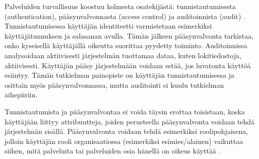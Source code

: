 Palveluiden turvallisuus koostuu kolmesta osatekijästä: tunnistautumisesta (authentication), pääsynvalvonnasta (access control) ja auditoinnista (audit) \cite{sandhu}. Tunnistautumisessa käyttäjän identiteetti varmistetaan esimerkiksi käyttäjätunnuksen ja salasanan avulla. Tämän jälkeen pääsynvalvonta tarkistaa, onko kyseisellä käyttäjällä oikeutta suorittaa pyydetty toiminto. Auditoinnissa analysoidaan aktiivisesti järjestelmän tuottamaa dataa, kuten lokitiedostoja, aktiivisesti. Käyttäjän pääsy järjestelmään voidaan estää, jos luvatonta käyttöä esiintyy. Tämän tutkielman pai\-no\-pis\-te on käyttäjän tunnistautumisessa ja osittain myös pääsynvalvonnassa, mutta auditointi ei kuulu tutkielman aihepiiriin.

Tunnistautumista ja pääsynvalvontaa ei voida täysin erottaa toisistaan, koska käyttäjään liittyy attribuutteja, joiden perusteella pääsynvalvonta voidaan tehdä järjestelmän sisällä. Pääsynvalvonta voidaan tehdä esimerkiksi roolipohjaisena, jolloin käyttäjän rooli organisaatiossa (esimerkiksi esimies/alainen) vaikuttaa siihen, mitä palveluita tai palveluiden osia hänellä on oikeus käyttää \cite{sandhu_rbac}.